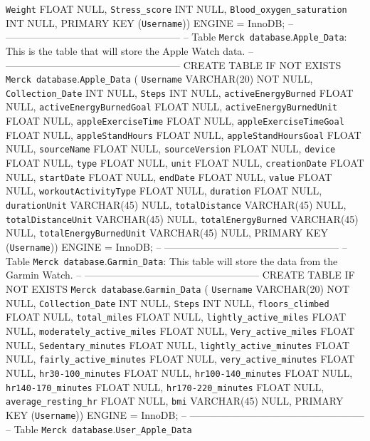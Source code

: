 \documentclass[]{book}
\begin{document}
\texttt{Weight} FLOAT NULL,
\texttt{Stress\_score} INT NULL,
\texttt{Blood\_oxygen\_saturation} INT NULL,
PRIMARY KEY (\texttt{Username}))
ENGINE = InnoDB;
-- -----------------------------------------------------
-- Table \texttt{Merck\ database}.\texttt{Apple\_Data}: This is the table that will store the Apple Watch data.
-- -----------------------------------------------------
CREATE TABLE IF NOT EXISTS \texttt{Merck\ database}.\texttt{Apple\_Data} (
\texttt{Username} VARCHAR(20) NOT NULL,
\texttt{Collection\_Date} INT NULL,
\texttt{Steps} INT NULL,
\texttt{activeEnergyBurned} FLOAT NULL,
\texttt{activeEnergyBurnedGoal} FLOAT NULL,
\texttt{activeEnergyBurnedUnit} FLOAT NULL,
\texttt{appleExerciseTime} FLOAT NULL,
\texttt{appleExerciseTimeGoal} FLOAT NULL,
\texttt{appleStandHours} FLOAT NULL,
\texttt{appleStandHoursGoal} FLOAT NULL,
\texttt{sourceName} FLOAT NULL,
\texttt{sourceVersion} FLOAT NULL,
\texttt{device} FLOAT NULL,
\texttt{type} FLOAT NULL,
\texttt{unit} FLOAT NULL,
\texttt{creationDate} FLOAT NULL,
\texttt{startDate} FLOAT NULL,
\texttt{endDate} FLOAT NULL,
\texttt{value} FLOAT NULL,
\texttt{workoutActivityType} FLOAT NULL,
\texttt{duration} FLOAT NULL,
\texttt{durationUnit} VARCHAR(45) NULL,
\texttt{totalDistance} VARCHAR(45) NULL,
\texttt{totalDistanceUnit} VARCHAR(45) NULL,
\texttt{totalEnergyBurned} VARCHAR(45) NULL,
\texttt{totalEnergyBurnedUnit} VARCHAR(45) NULL,
PRIMARY KEY (\texttt{Username}))
ENGINE = InnoDB;
-- -----------------------------------------------------
-- Table \texttt{Merck\ database}.\texttt{Garmin\_Data}: This table will store the data from the Garmin Watch.
-- -----------------------------------------------------
CREATE TABLE IF NOT EXISTS \texttt{Merck\ database}.\texttt{Garmin\_Data} (
\texttt{Username} VARCHAR(20) NOT NULL,
\texttt{Collection\_Date} INT NULL,
\texttt{Steps} INT NULL,
\texttt{floors\_climbed} FLOAT NULL,
\texttt{total\_miles} FLOAT NULL,
\texttt{lightly\_active\_miles} FLOAT NULL,
\texttt{moderately\_active\_miles} FLOAT NULL,
\texttt{Very\_active\_miles} FLOAT NULL,
\texttt{Sedentary\_minutes} FLOAT NULL,
\texttt{lightly\_active\_minutes} FLOAT NULL,
\texttt{fairly\_active\_minutes} FLOAT NULL,
\texttt{very\_active\_minutes} FLOAT NULL,
\texttt{hr30-100\_minutes} FLOAT NULL,
\texttt{hr100-140\_minutes} FLOAT NULL,
\texttt{hr140-170\_minutes} FLOAT NULL,
\texttt{hr170-220\_minutes} FLOAT NULL,
\texttt{average\_resting\_hr} FLOAT NULL,
\texttt{bmi} VARCHAR(45) NULL,
PRIMARY KEY (\texttt{Username}))
ENGINE = InnoDB;
-- -----------------------------------------------------
-- Table \texttt{Merck\ database}.\texttt{User\_Apple\_Data}
\end{document}
